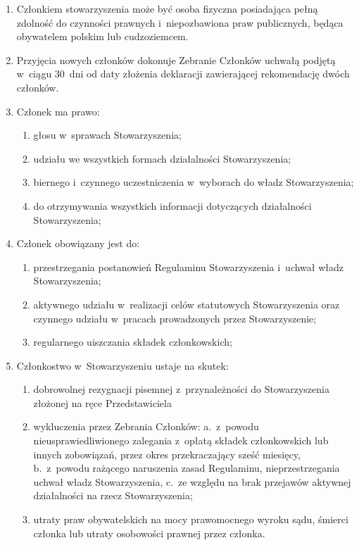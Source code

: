 \documentclass[11pt,a4paper]{article}
\begin{document}
\begin{enumerate}
  \item Członkiem stowarzyszenia może być osoba fizyczna posiadająca pełną zdolność do czynności prawnych i~niepozbawiona praw publicznych, będąca obywatelem polskim lub cudzoziemcem.

  \item Przyjęcia nowych członków dokonuje Zebranie Członków uchwałą podjętą w~ciągu 30~dni od daty złożenia deklaracji zawierającej rekomendację dwóch członków.

  \item Członek ma prawo:
  \begin{enumerate}
    \item głosu w~sprawach Stowarzyszenia;
    \item udziału we wszystkich formach działalności Stowarzyszenia;
    \item biernego i~czynnego uczestniczenia w~wyborach do władz Stowarzyszenia;
    \item do otrzymywania wszystkich informacji dotyczących działalności Stowarzyszenia;
  \end{enumerate}

  \item Członek obowiązany jest do:
  \begin{enumerate}
    \item przestrzegania postanowień Regulaminu Stowarzyszenia i~uchwał władz Stowarzyszenia;
    \item aktywnego udziału w~realizacji celów statutowych Stowarzyszenia oraz czynnego udziału w~pracach prowadzonych przez Stowarzyszenie;
    \item regularnego uiszczania składek członkowskich;
  \end{enumerate}

  \item Członkostwo w~Stowarzyszeniu ustaje na skutek:
  \begin{enumerate}
    \item dobrowolnej rezygnacji pisemnej z~przynależności do Stowarzyszenia złożonej na ręce Przedstawiciela
    \item wykluczenia przez Zebrania Członków: a.~z~powodu nieusprawiedliwionego zalegania z~opłatą składek członkowskich lub innych zobowiązań, przez okres przekraczający sześć miesięcy, b.~z~powodu rażącego naruszenia zasad Regulaminu, nieprzestrzegania uchwał władz Stowarzyszenia, c.~ze względu na brak przejawów aktywnej działalności na rzecz Stowarzyszenia;
    \item utraty praw obywatelskich na mocy prawomocnego wyroku sądu, śmierci członka lub utraty osobowości prawnej przez członka.
  \end{enumerate}


\end{enumerate}
\end{document}
